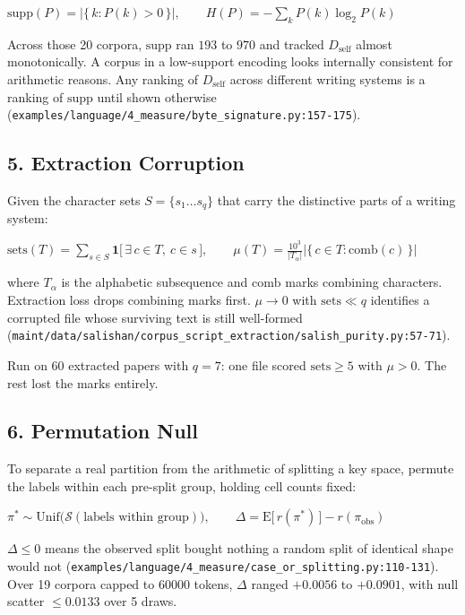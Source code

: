 \(\mathrm{supp}(P) = \bigl|\{\,k : P(k) > 0\,\}\bigr|, \qquad H(P) = -\sum_{k} P(k)\log_2 P(k)\)

Across those 20 corpora, \(\mathrm{supp}\) ran \(193\) to \(970\) and tracked \(D_{\text{self}}\) almost monotonically. A corpus in a low-support encoding looks internally consistent for arithmetic reasons. Any ranking of \(D_{\text{self}}\) across different writing systems is a ranking of \(\mathrm{supp}\) until shown otherwise (\texttt{examples/\allowbreak{}language/\allowbreak{}4\_\allowbreak{}measure/\allowbreak{}byte\_\allowbreak{}signature.\allowbreak{}py:157-\allowbreak{}175}).

\subsection{5. Extraction Corruption}

Given the character sets \(S = \{s_1 \dots s_q\}\) that carry the distinctive parts of a writing system:

\(\mathrm{sets}(T) = \sum_{s \in S} \mathbf{1}\bigl[\,\exists\, c \in T,\ c \in s\,\bigr], \qquad \mu(T) = \frac{10^3}{|T_\alpha|}\bigl|\{\,c \in T : \mathrm{comb}(c)\,\}\bigr|\)

where \(T_\alpha\) is the alphabetic subsequence and \(\mathrm{comb}\) marks combining characters. Extraction loss drops combining marks first. \(\mu \to 0\) with \(\mathrm{sets} \ll q\) identifies a corrupted file whose surviving text is still well-formed (\texttt{maint/\allowbreak{}data/\allowbreak{}salishan/\allowbreak{}corpus\_\allowbreak{}script\_\allowbreak{}extraction/\allowbreak{}salish\_\allowbreak{}purity.\allowbreak{}py:57-\allowbreak{}71}).

Run on 60 extracted papers with \(q=7\): one file scored \(\mathrm{sets} \ge 5\) with \(\mu > 0\). The rest lost the marks entirely.

\subsection{6. Permutation Null}

To separate a real partition from the arithmetic of splitting a key space, permute the labels within each pre-split group, holding cell counts fixed:

\(\pi^{\ast} \sim \mathrm{Unif}\bigl(\mathcal{S}(\text{labels within group})\bigr), \qquad \Delta = \mathrm{E}\bigl[\,r(\pi^{\ast})\,\bigr] - r(\pi_{\text{obs}})\)

\(\Delta \le 0\) means the observed split bought nothing a random split of identical shape would not (\texttt{examples/\allowbreak{}language/\allowbreak{}4\_\allowbreak{}measure/\allowbreak{}case\_\allowbreak{}or\_\allowbreak{}splitting.\allowbreak{}py:110-\allowbreak{}131}). Over 19 corpora capped to 60000 tokens, \(\Delta\) ranged \(+0.0056\) to \(+0.0901\), with null scatter \(\le 0.0133\) over 5 draws.

